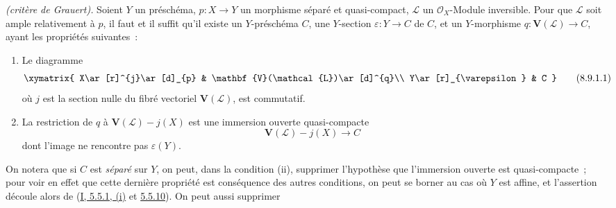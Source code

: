 \begin{theorem}[8.9.1]
\label{II.8.9.1-fr}
\emph{(critère de Grauert).} Soient $Y$ un préschéma,
$p:X\to Y$ un morphisme séparé et quasi-compact, $\mathcal{L}$ un
$\mathcal{O}_X$-Module inversible. Pour que $\mathcal{L}$ soit ample
relativement à $p$, il faut et il suffit qu'il existe un $Y$-préschéma $C$,
une $Y$-section $\varepsilon:Y\to C$ de $C$, et un $Y$-morphisme
$q:\mathbf{V}(\mathcal{L})\to C$, ayant les propriétés suivantes~:
\begin{enumerate}
  \item[\rm{(i)}] Le diagramme
  \begin{equation}
  \label{II.8.9.1.1-fr}
    \xymatrix{
      X\ar[r]^{j}\ar[d]_{p} & \mathbf{V}(\mathcal{L})\ar[d]^{q}\\
      Y\ar[r]_{\varepsilon} & C
    }
  \tag{8.9.1.1}
  \end{equation}
  où $j$ est la section nulle du fibré vectoriel $\mathbf{V}(\mathcal{L})$,
  est commutatif.
  \item[\rm{(ii)}] La restriction de $q$ à
  $\mathbf{V}(\mathcal{L})-j(X)$ est une immersion ouverte quasi-compacte
  \[
    \mathbf{V}(\mathcal{L})-j(X)\longrightarrow C
  \]
  dont l'image ne rencontre pas $\varepsilon(Y)$.
\end{enumerate}
\end{theorem}

On notera que si $C$ est \emph{séparé} sur $Y$, on peut, dans la condition
(ii), supprimer l'hypothèse que l'immersion ouverte est quasi-compacte~; pour
voir en effet que cette dernière propriété est conséquence des autres
conditions, on peut se borner au cas où $Y$ est affine, et l'assertion découle
alors de (\hyperref[I.5.5.1-fr]{I, 5.5.1, (i)} et
\hyperref[I.5.5.10-fr]{5.5.10}). On peut aussi supprimer

